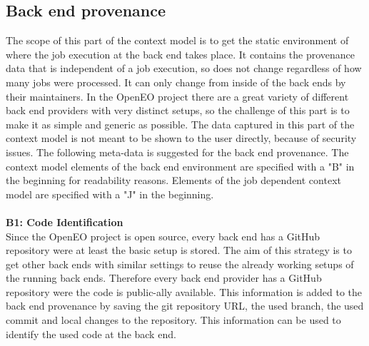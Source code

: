 \documentclass[draft,final]{vutinfth} %
\begin{document}
\subsection{Back end provenance}\label{Design:Back end provenance}
The scope of this part of the context model is to get the static environment of where the job execution at the back end takes place. It contains the provenance data that is independent of a job execution, so does not change regardless of how many jobs were processed. It can only change from inside of the back ends by their maintainers. In the OpenEO project there are a great variety of different back end providers with very distinct setups, so the challenge of this part is to make it as simple and generic as possible. The data captured in this part of the context model is not meant to be shown to the user directly, because of security issues. The following meta-data is suggested for the back end provenance. The context model elements of the back end environment are specified with a "B" in the beginning for readability reasons. Elements of the job dependent context model are specified with a "J" in the beginning. 
\\ \\
\textbf{B1: Code Identification} \\
Since the OpenEO project is open source, every back end has a GitHub repository were at least the basic setup is stored. The aim of this strategy is to get other back ends with similar settings to reuse the already working setups of the running back ends.  Therefore every back end provider has a GitHub repository were the code is public-ally available. This information is added to the back end provenance by saving the git repository URL, the used branch, the used commit and local changes to the repository. This information can be used to identify the used code at the back end.    
\end{document}
